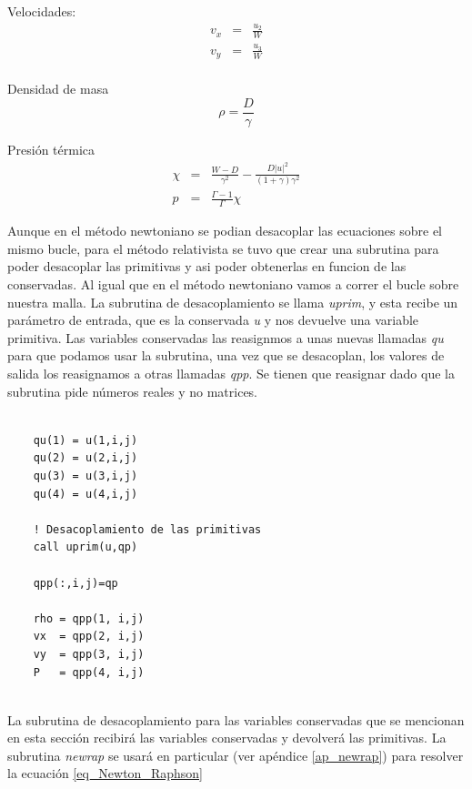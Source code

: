\documentclass[12pt,a4paper]{book}
\providecommand{\abs}[1]{\lvert#1\rvert} %
\begin{document}
Velocidades:
\begin{eqnarray}
v_{x}&=&\frac{u_{2}}{W}\\
v_{y}&=&\frac{u_{3}}{W}\\
\end{eqnarray}

Densidad de masa 
\begin{equation}
\rho=\frac{D}{\gamma}
\end{equation}

Presión térmica
\begin{eqnarray}
\chi&=&\frac{W-D}{\gamma^{2}}-\frac{D \abs{u}^{2}}{(1+\gamma)\gamma^{2}}\\
p&=&\frac{\Gamma-1}{\Gamma} \chi
\end{eqnarray}

Aunque en el método newtoniano se podian desacoplar las ecuaciones sobre el mismo bucle, 
para el método relativista se tuvo que crear una subrutina para poder desacoplar las primitivas y asi poder obtenerlas en funcion de las conservadas. 
Al igual que en el método newtoniano vamos a correr el bucle sobre nuestra malla. La subrutina de desacoplamiento se llama \emph{uprim}, 
y esta recibe un parámetro de entrada, que es la conservada \emph{u} y nos devuelve una variable primitiva. 
Las variables conservadas las reasignmos a unas nuevas llamadas \emph{qu} para que podamos usar la subrutina, una vez que se desacoplan, 
los valores de salida los reasignamos a otras llamadas \emph{qpp}. Se tienen que reasignar dado que la subrutina pide números reales y no matrices.

\begin{lstlisting}[frame=single] 
        
    qu(1) = u(1,i,j)
    qu(2) = u(2,i,j)
    qu(3) = u(3,i,j)
    qu(4) = u(4,i,j)

    ! Desacoplamiento de las primitivas
    call uprim(u,qp)

    qpp(:,i,j)=qp

    rho = qpp(1, i,j)
    vx  = qpp(2, i,j)
    vy  = qpp(3, i,j)
    P   = qpp(4, i,j)


\end{lstlisting}

La subrutina de desacoplamiento para las variables conservadas que se mencionan en esta sección recibirá las variables conservadas
y devolverá las primitivas. La subrutina \emph{newrap} se usará en particular 
(ver apéndice \ref{ap_newrap}) para resolver la ecuación \ref{eq_Newton_Raphson}
\end{document}

